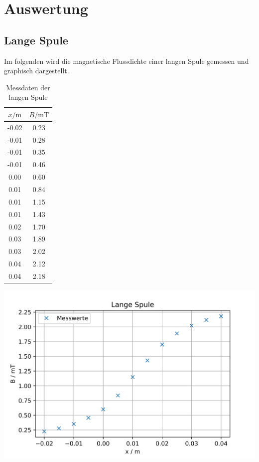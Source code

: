 \section{Auswertung}
\label{sec:Auswertung}

\subsection{Lange Spule}

Im folgenden wird die magnetische Flussdichte einer langen Spule gemessen und graphisch dargestellt.
\begin{table}
\centering
\caption{Messdaten der langen Spule}
\begin{tabular}{c c}
  \toprule
  $x / \unit\m$ &  $B / \unit{\milli\tesla}$ \\
  \midrule
  -0.02 &         0.23 \\
  -0.01 &         0.28 \\
  -0.01 &         0.35 \\
  -0.01 &         0.46 \\
    0.00 &         0.60 \\
    0.01 &         0.84 \\
    0.01 &         1.15 \\
    0.01 &         1.43 \\
    0.02 &         1.70 \\
    0.03 &         1.89 \\
    0.03 &         2.02 \\
    0.04 &         2.12 \\
    0.04 &         2.18 \\
  \bottomrule
\end{tabular}
\end{table}


\includegraphics[width=\textwidth]{pictures/LangeSpule1.png}


